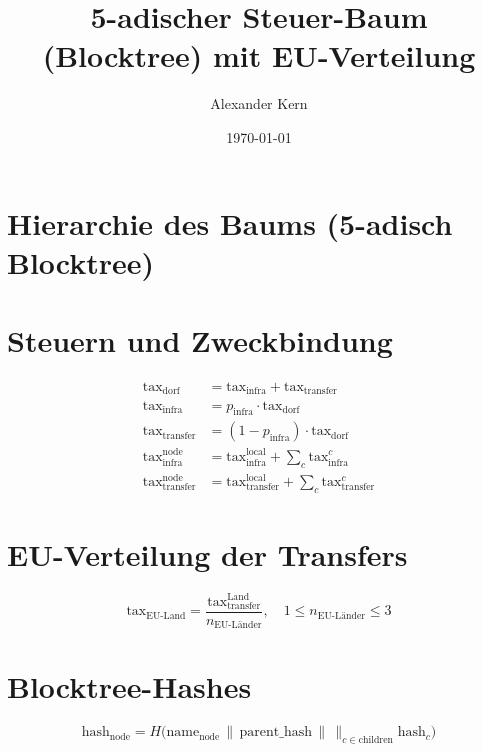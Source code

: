\documentclass[a4paper,12pt]{article}
\title{5-adischer Steuer-Baum (Blocktree) mit EU-Verteilung}
\author{Alexander Kern}
\date{\today}
\begin{document}
\maketitle

\section{Hierarchie des Baums (5-adisch Blocktree)}
\begin{center}
\end{center}

\section{Steuern und Zweckbindung}
\begin{align*}
\text{tax}_\text{dorf} &= \text{tax}_\text{infra} + \text{tax}_\text{transfer} \\
\text{tax}_\text{infra} &= p_\text{infra} \cdot \text{tax}_\text{dorf} \\
\text{tax}_\text{transfer} &= (1 - p_\text{infra}) \cdot \text{tax}_\text{dorf} \\
\text{tax}_\text{infra}^{\text{node}} &= \text{tax}_\text{infra}^{\text{local}} + \sum_{c} \text{tax}_\text{infra}^c \\
\text{tax}_\text{transfer}^{\text{node}} &= \text{tax}_\text{transfer}^{\text{local}} + \sum_{c} \text{tax}_\text{transfer}^c
\end{align*}

\section{EU-Verteilung der Transfers}
\[
\text{tax}_\text{EU-Land} = \frac{\text{tax}_\text{transfer}^{\text{Land}}}{n_\text{EU-Länder}}, \quad 1 \le n_\text{EU-Länder} \le 3
\]

\section{Blocktree-Hashes}
\[
\text{hash}_\text{node} = H\Big(\text{name}_\text{node} \,\|\, \text{parent\_hash} \,\|\, \big\|_{c \in \text{children}} \text{hash}_c \Big)
\]
\end{document}
